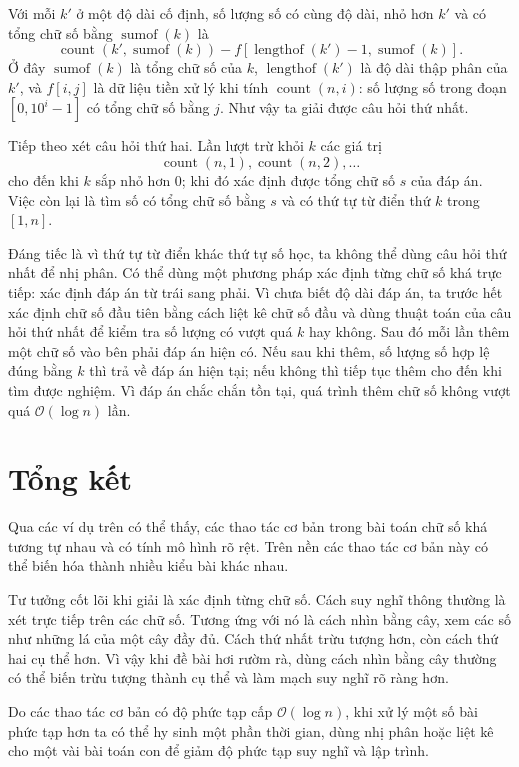 \documentclass[11pt]{article}
\newcommand{\Oh}{\mathcal{O}}
\begin{document}
Với mỗi $k'$ ở một độ dài cố định, số lượng số có cùng độ dài, nhỏ hơn $k'$ và
có tổng chữ số bằng $\operatorname{sumof}(k)$ là
\[
  \operatorname{count}(k',\operatorname{sumof}(k))
  -f[\operatorname{lengthof}(k')-1,\operatorname{sumof}(k)].
\]
Ở đây $\operatorname{sumof}(k)$ là tổng chữ số của $k$,
$\operatorname{lengthof}(k')$ là độ dài thập phân của $k'$, và $f[i,j]$ là dữ
liệu tiền xử lý khi tính $\operatorname{count}(n,i)$: số lượng số trong đoạn
$[0,10^i-1]$ có tổng chữ số bằng $j$. Như vậy ta giải được câu hỏi thứ nhất.

Tiếp theo xét câu hỏi thứ hai. Lần lượt trừ khỏi $k$ các giá trị
\[
  \operatorname{count}(n,1),\operatorname{count}(n,2),\ldots
\]
cho đến khi $k$ sắp nhỏ hơn $0$; khi đó xác định được tổng chữ số $s$ của đáp
án. Việc còn lại là tìm số có tổng chữ số bằng $s$ và có thứ tự từ điển thứ
$k$ trong $[1,n]$.

Đáng tiếc là vì thứ tự từ điển khác thứ tự số học, ta không thể dùng câu hỏi
thứ nhất để nhị phân. Có thể dùng một phương pháp xác định từng chữ số khá
trực tiếp: xác định đáp án từ trái sang phải. Vì chưa biết độ dài đáp án, ta
trước hết xác định chữ số đầu tiên bằng cách liệt kê chữ số đầu và dùng thuật
toán của câu hỏi thứ nhất để kiểm tra số lượng có vượt quá $k$ hay không. Sau
đó mỗi lần thêm một chữ số vào bên phải đáp án hiện có. Nếu sau khi thêm, số
lượng số hợp lệ đúng bằng $k$ thì trả về đáp án hiện tại; nếu không thì tiếp
tục thêm cho đến khi tìm được nghiệm. Vì đáp án chắc chắn tồn tại, quá trình
thêm chữ số không vượt quá $\Oh(\log n)$ lần.

\section{Tổng kết}

Qua các ví dụ trên có thể thấy, các thao tác cơ bản trong bài toán chữ số khá
tương tự nhau và có tính mô hình rõ rệt. Trên nền các thao tác cơ bản này có
thể biến hóa thành nhiều kiểu bài khác nhau.

Tư tưởng cốt lõi khi giải là xác định từng chữ số. Cách suy nghĩ thông thường
là xét trực tiếp trên các chữ số. Tương ứng với nó là cách nhìn bằng cây, xem
các số như những lá của một cây đầy đủ. Cách thứ nhất trừu tượng hơn, còn cách
thứ hai cụ thể hơn. Vì vậy khi đề bài hơi rườm rà, dùng cách nhìn bằng cây
thường có thể biến trừu tượng thành cụ thể và làm mạch suy nghĩ rõ ràng hơn.

Do các thao tác cơ bản có độ phức tạp cấp $\Oh(\log n)$, khi xử lý một số bài
phức tạp hơn ta có thể hy sinh một phần thời gian, dùng nhị phân hoặc liệt kê
cho một vài bài toán con để giảm độ phức tạp suy nghĩ và lập trình.
\end{document}
